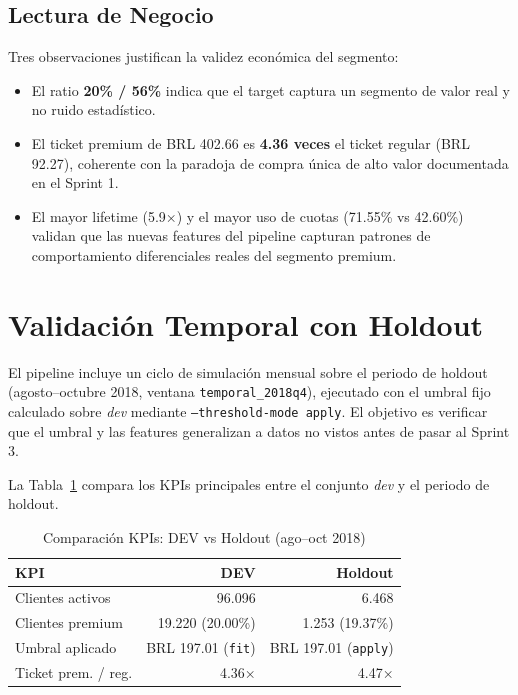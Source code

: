 \documentclass[journal,letterpaper]{IEEEtran}
\begin{document}
\subsection{Lectura de Negocio}
Tres observaciones justifican la validez económica del segmento:
\begin{itemize}
    \item El ratio \textbf{20\% / 56\%} indica que el target captura un segmento de valor real y no ruido estadístico.
    \item El ticket premium de BRL 402.66 es \textbf{4.36 veces} el ticket regular (BRL 92.27), coherente con la paradoja de compra única de alto valor documentada en el Sprint 1.
    \item El mayor lifetime (5.9×) y el mayor uso de cuotas (71.55\% vs 42.60\%) validan que las nuevas features del pipeline capturan patrones de comportamiento diferenciales reales del segmento premium.
\end{itemize}

\section{Validación Temporal con Holdout}

El pipeline incluye un ciclo de simulación mensual sobre el periodo de holdout (agosto--octubre 2018, ventana \texttt{temporal\_2018q4}), ejecutado con el umbral fijo calculado sobre \textit{dev} mediante \texttt{--threshold-mode apply}. El objetivo es verificar que el umbral y las features generalizan a datos no vistos antes de pasar al Sprint 3.

La Tabla~\ref{tab:holdout} compara los KPIs principales entre el conjunto \textit{dev} y el periodo de holdout.

\begin{table}[h]
\centering
\caption{Comparación KPIs: DEV vs Holdout (ago--oct 2018)}
\label{tab:holdout}
\begin{tabular}{lrr}
\toprule
KPI & DEV & Holdout \\
\midrule
Clientes activos       & 96.096 & 6.468 \\
Clientes premium       & 19.220 (20.00\%) & 1.253 (19.37\%) \\
Umbral aplicado        & BRL 197.01 (\texttt{fit}) & BRL 197.01 (\texttt{apply}) \\
Ticket prem. / reg.    & 4.36× & 4.47× \\
\bottomrule
\end{tabular}
\end{table}
\end{document}

